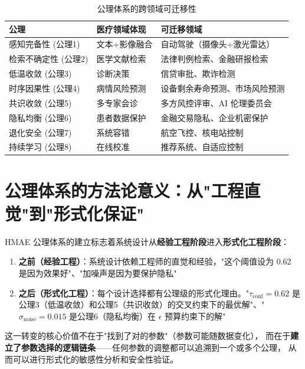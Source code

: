 \documentclass[11pt,a4paper]{ctexart}
\theoremstyle{remark}
\begin{document}
\begin{table}[H]
\centering
\small
\begin{tabular}{lll}
\toprule
\textbf{公理} & \textbf{医疗领域体现} & \textbf{可迁移领域} \\
\midrule
感知完备性 (公理1) & 文本+影像融合 & 自动驾驶（摄像头+激光雷达） \\
检索不确定性 (公理2) & 医学文献检索 & 法律判例检索、金融研报检索 \\
低温收敛 (公理3) & 诊断决策 & 信贷审批、欺诈检测 \\
时序因果性 (公理4) & 病情风险预测 & 设备剩余寿命预测、市场风险预测 \\
共识收敛 (公理5) & 多专家会诊 & 多方风控评审、AI 伦理委员会 \\
隐私均衡 (公理6) & 患者数据保护 & 金融交易隐私、企业机密保护 \\
退化安全 (公理7) & 系统容错 & 航空飞控、核电站控制 \\
持续学习 (公理8) & 在线校准 & 推荐系统、自适应控制 \\
\bottomrule
\end{tabular}
\caption{公理体系的跨领域可迁移性}
\end{table}

\section{公理体系的方法论意义：从"工程直觉"到"形式化保证"}

HMAE 公理体系的建立标志着系统设计从\textbf{经验工程阶段}进入\textbf{形式化工程阶段}：

\begin{enumerate}[nosep]
\item \textbf{之前（经验工程）}：系统设计依赖工程师的直觉和经验，"这个阈值设为 0.62 是因为效果好"、"加噪声是因为要保护隐私"
\item \textbf{之后（形式化工程）}：每个设计选择都有公理级的形式化理由。"$\tau_{\text{conf}} = 0.62$ 是公理3（低温收敛）和公理5（共识收敛）的交叉约束下的最优解"、"$\sigma_{\text{noise}} = 0.015$ 是公理6（隐私均衡）在 $\epsilon$ 预算约束下的解"
\end{enumerate}

这一转变的核心价值不在于"找到了对的参数"（参数可能随数据变化），
而在于\textbf{建立了参数选择的逻辑链条}——任何参数的调整都可以追溯到一个或多个公理，
从而可以进行形式化的敏感性分析和安全性验证。

\end{document}
